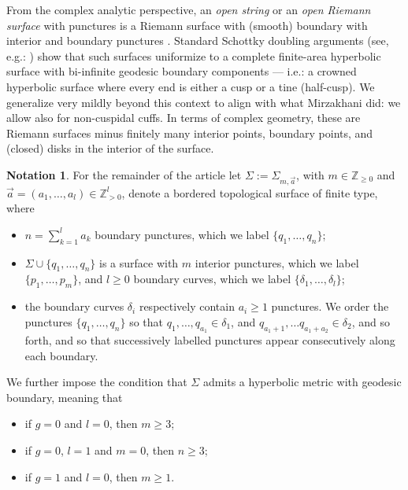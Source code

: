 \documentclass{amsart}
\theoremstyle{definition}
\newtheorem{notation}[proposition]{Notation}
\begin{document}
From the complex analytic perspective, an \emph{open string} or an \emph{open Riemann surface} with punctures is a Riemann surface with (smooth) boundary with interior and boundary punctures \cite[Section~1.3]{zbMATH07951658}. Standard Schottky doubling arguments (see, e.g.: \cite[Pg.~24]{huang_thesis}) show that such surfaces uniformize to a complete finite-area hyperbolic surface with bi-infinite geodesic boundary components --- i.e.: a crowned hyperbolic surface where every end is either a cusp or a tine (half-cusp). We generalize very mildly beyond this context to align with what Mirzakhani did: we allow also for non-cuspidal cuffs. In terms of complex geometry, these are Riemann surfaces minus finitely many interior points, boundary points, and (closed) disks in the interior of the surface. 

\begin{notation}
\label{notn:sigmasurface}
For the remainder of the article let $\Sigma:=\Sigma_{m,\vec{a}}$, with $m\in\mathbb{Z}_{\geqslant 0}$ and $\vec{a}=(a_1,\ldots,a_l)\in\mathbb{Z}_{>0}^l$, denote a bordered topological surface of finite type, where
\begin{itemize}
\item
$n=\sum_{k=1}^{l}a_k$ boundary punctures, which we label $\{q_1,\ldots,q_n\}$; 
\item
$\Sigma\cup\{q_1,\ldots,q_n\}$ is a surface with $m$ interior punctures, which we label $\{p_1,\ldots,p_m\}$, and $l\geq0$ boundary curves, which we label $\{\delta_1,\ldots,\delta_l\}$; 
\item
the boundary curves $\delta_i$ respectively contain $a_i\geqslant 1$ punctures. We order the punctures $\{q_1,\ldots,q_n\}$ so that $q_1,\ldots,q_{a_1}\in \delta_1$, and $q_{a_1+1},\ldots q_{a_1+a_2}\in \delta_2$, and so forth, and so that successively labelled punctures appear consecutively along each boundary. 
\end{itemize}
We further impose the condition that $\Sigma$ admits a hyperbolic metric with geodesic boundary, meaning that
\begin{itemize}
    \item if $g=0$ and $l=0$, then $m\geqslant3$; 
    \item if $g=0$, $l=1$ and $m=0$, then $n\geqslant3$;
    \item if $g=1$ and $l=0$, then $m\geqslant1$.
\end{itemize}
\end{notation}
\end{document}
